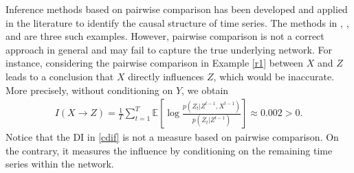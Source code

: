 Inference methods based on pairwise comparison has been developed and applied in the literature to identify the causal structure of time series.  The methods in \citet{billio2012econometric}, \citet{billio2010measuring}, and \citet{allen2010financial} are three such examples.
However,  pairwise comparison is not a correct approach in general and may fail to capture the true underlying network.
For instance,  considering the pairwise comparison in Example \ref{r1} between $X$ and $Z$ leads to a conclusion that $X$ directly influences $Z$, which would be inaccurate.
More precisely, without conditioning on $Y$, we obtain
 \begin{align*}
 I(X\rightarrow Z)=\frac{1}{T}\sum_{t=1}^T\mathbb{E}\left[\log\frac{p(Z_t|Z^{t-1},X^{t-1})}{p(Z_t|Z^{t-1})}\right]\approx 0.002>0.
 \end{align*}
Notice that the DI in \eqref{cdif} is not a measure based on pairwise comparison. On the contrary, it measures the influence by conditioning on the remaining time series within the network. 

\clearpage

\begin{comment}
\begin{remark}
A causal model allows a factorization of the joint density function in some specific ways.
It was shown in \citet{directed} that under a mild assumption, the joint density function of a causal discrete-time dynamical system with DIG $G(\mathcal{R},\mathcal{E})$ can be factorized as follows,
\begin{equation}\label{abo}
p(R_1,...,R_m)=\prod_{i=1}^{m}\prod_{t=1}^T p(R_{i,t}|\mathcal{R}_{\mathcal{PA}_i\cup\{i\}}^{t-1}).
\end{equation}
Such factorization is called a generative model. 
\end{remark}
\end{comment}

